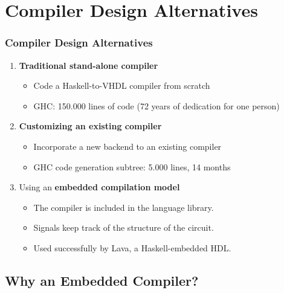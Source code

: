 \documentclass{beamer}
\begin{document}
\section{Compiler Design Alternatives}

\beamerdefaultoverlayspecification{}
\begin{frame}
  \frametitle{Compiler Design Alternatives}
  \begin{enumerate}[(1)]
    
    \item \textbf{Traditional stand-alone compiler}
      \begin{itemize}  
      \item Code a Haskell-to-VHDL compiler from scratch
      \item GHC: 150.000 lines of code (72 years of dedication for one person)
      \end{itemize}
      \pause
    \item \textbf{Customizing an existing compiler}
      \begin{itemize}
      \item Incorporate a new backend to an existing compiler
      \item GHC code generation subtree: 5.000 lines, 14 months
      \end{itemize}
      \pause
    \item Using an \textbf{embedded compilation model}
      \begin{itemize}
      \item The compiler is included in the language library.
      \item Signals keep track of the structure of the circuit.
      \item Used successfully by Lava, a Haskell-embedded HDL.
    \end{itemize}
  \end{enumerate}
\end{frame}


\subsection{Why an Embedded Compiler?}
\end{document}
